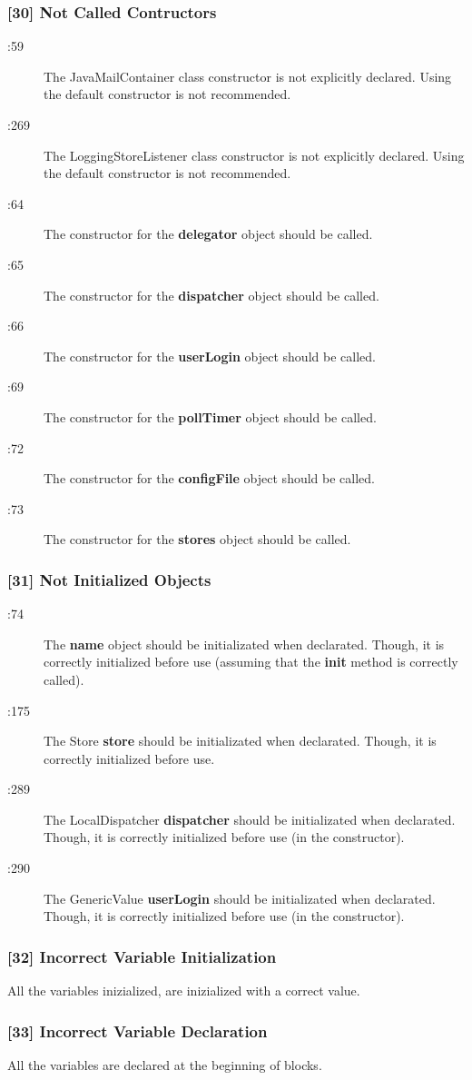 \subsubsection{[30] Not Called Contructors}
\begin{description}
	\item[:59] The JavaMailContainer class constructor is not explicitly declared. Using the default constructor is not recommended.
	\item[:269] The LoggingStoreListener class constructor is not explicitly declared. Using the default constructor is not recommended.
	\item[:64] The constructor for the \textbf{delegator} object should be called.
	\item[:65] The constructor for the \textbf{dispatcher} object should be called.
	\item[:66] The constructor for the \textbf{userLogin} object should be called.
	\item[:69] The constructor for the \textbf{pollTimer} object should be called.
	\item[:72] The constructor for the \textbf{configFile} object should be called.
	\item[:73] The constructor for the \textbf{stores} object should be called.
\end{description}

\subsubsection{[31] Not Initialized Objects}
\begin{description}
	\item[:74] The \textbf{name} object should be initializated when declarated. Though, it is correctly initialized before use (assuming that the \textbf{init} method is correctly called).
	\item[:175] The Store \textbf{store} should be initializated when declarated. Though, it is correctly initialized before use.
	\item[:289] The LocalDispatcher \textbf{dispatcher} should be initializated when declarated. Though, it is correctly initialized before use (in the constructor).
	\item[:290] The GenericValue \textbf{userLogin} should be initializated when declarated. Though, it is correctly initialized before use (in the constructor).
\end{description}


\subsubsection{[32] Incorrect Variable Initialization}
All the variables inizialized, are inizialized with a correct value.

\subsubsection{[33] Incorrect Variable Declaration}
All the variables are declared at the beginning of blocks.
